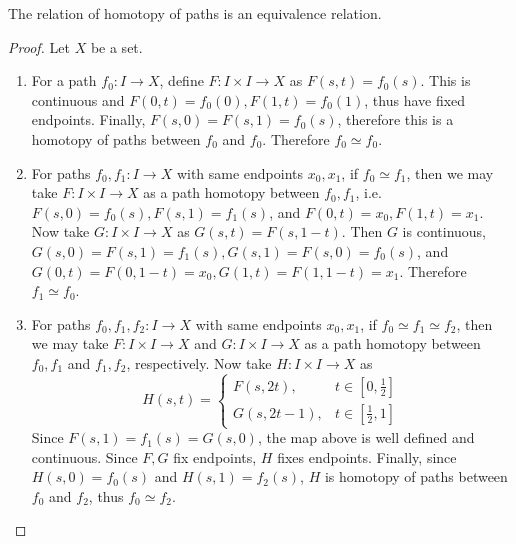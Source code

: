 \begin{prop} The relation of homotopy of paths is an equivalence relation.
\end{prop}
\begin{proof} Let $X$ be a set.
\begin{enumerate}
\item For a path $f_0:I\rightarrow X$, define $F:I\times I\rightarrow X$ as $F(s,t)=f_0(s)$. This is continuous and $F(0,t)=f_0(0), F(1,t)=f_0(1)$, thus have fixed endpoints. Finally, $F(s,0)=F(s,1)=f_0(s)$, therefore this is a homotopy of paths between $f_0$ and $f_0$. Therefore $f_0\simeq f_0$.
\item For paths $f_0,f_1:I\rightarrow X$ with same endpoints $x_0,x_1$, if $f_0\simeq f_1$, then we may take $F:I\times I\rightarrow X$ as a path homotopy between $f_0,f_1$, i.e. $F(s,0)=f_0(s), F(s,1)=f_1(s)$, and $F(0,t)=x_0,F(1,t)=x_1$. Now take $G:I\times I\rightarrow X$ as $G(s,t)=F(s,1-t)$. Then $G$ is continuous, $G(s,0)=F(s,1)=f_1(s), G(s,1)=F(s,0)=f_0(s)$, and $G(0,t)=F(0,1-t)=x_0, G(1,t)=F(1,1-t)=x_1$. Therefore $f_1\simeq f_0$.
\item For paths $f_0,f_1,f_2:I\rightarrow X$ with same endpoints $x_0,x_1$, if $f_0\simeq f_1\simeq f_2$, then we may take $F:I\times I\rightarrow X$ and $G:I\times I\rightarrow X$ as a path homotopy between $f_0,f_1$ and $f_1,f_2$, respectively. Now take $H:I\times I\rightarrow X$ as
\begin{equation}
H(s,t)=\begin{cases}F(s,2t),&t\in[0,\frac{1}{2}]\\
G(s,2t-1),&t\in [\frac{1}{2},1]
\end{cases}
\end{equation}
Since $F(s,1)=f_1(s)=G(s,0)$, the map above is well defined and continuous. Since $F,G$ fix endpoints, $H$ fixes endpoints. Finally, since $H(s,0)=f_0(s)$ and $H(s,1)=f_2(s)$, $H$ is homotopy of paths between $f_0$ and $f_2$, thus $f_0\simeq f_2$.
\end{enumerate}
\end{proof}

